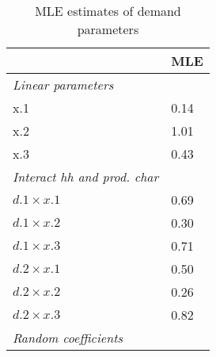 \begin{table}
\centering
\caption{MLE estimates of demand parameters}
\label{tab:mleMicro}
\begin{tabular}{ll}
\toprule
{} &   MLE \\
\midrule
\emph{Linear parameters}          &       \\
x.1                               &  0.14 \\
x.2                               &  1.01 \\
x.3                               &  0.43 \\
\emph{Interact hh and prod. char} &       \\
$d.1 \times x.1$                  &  0.69 \\
$d.1 \times x.2$                  &  0.30 \\
$d.1 \times x.3$                  &  0.71 \\
$d.2 \times x.1$                  &  0.50 \\
$d.2 \times x.2$                  &  0.26 \\
$d.2 \times x.3$                  &  0.82 \\
\emph{Random coefficients}        &       \\
\bottomrule
\end{tabular}
\end{table}
